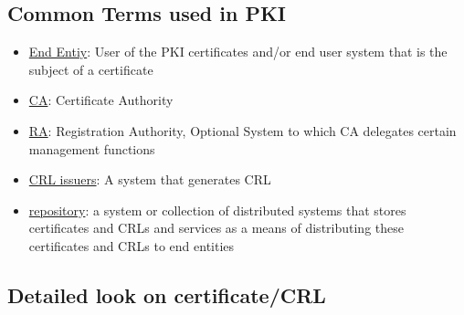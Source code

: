 \documentclass[a4paper]{article}
\begin{document}
\subsection{Common Terms used in PKI}
\begin{itemize}
    \item \underline{End Entiy}: User of the PKI certificates and/or end user system that is the subject of a certificate
    \item \underline{CA}: Certificate Authority
    \item \underline{RA}: Registration Authority, Optional System to which CA delegates certain management functions
    \item \underline{CRL issuers}: A system that generates CRL
    \item \underline{repository}: a system or collection of distributed systems that stores certificates and CRLs and services as a means of distributing these certificates and CRLs to end entities
\end{itemize}
\subsection{Detailed look on certificate/CRL}
\end{document}
